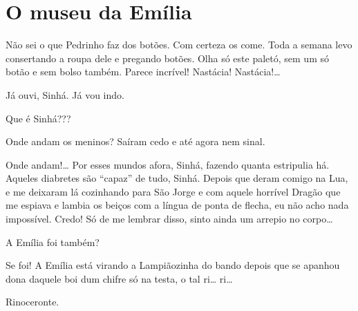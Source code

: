 
\chapter{O museu da Emília}


\noindent{}



 Não sei o que Pedrinho faz dos botões. Com certeza os
come. Toda a semana levo consertando a roupa dele e pregando botões.
Olha só este paletó, sem um só botão e sem bolso também. Parece
incrível!  Nastácia! 
Nastácia!\ldots{}

 Já ouvi, Sinhá. Já vou indo. 

 Que é Sinhá???

 Onde andam os meninos? Saíram cedo e até agora nem sinal.

 Onde andam!\ldots{} Por esses mundos afora, Sinhá,
fazendo quanta estripulia há. Aqueles diabretes são ``capaz'' de tudo,
Sinhá. Depois que deram comigo na Lua, e me deixaram lá cozinhando para
São Jorge e com aquele horrível Dragão que me espiava e lambia os beiços
com a língua de ponta de flecha, eu não acho nada impossível. Credo! Só
de me lembrar disso, sinto ainda um arrepio no corpo\ldots{}

 A Emília foi também?

 Se foi! A Emília está virando a Lampiãozinha do bando
depois que se apanhou dona daquele boi dum chifre só na testa, o tal
ri\ldots{} ri\ldots{}

 Rinoceronte.

